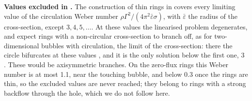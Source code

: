\documentclass[11pt]{article}
\begin{document}
\textbf{Values excluded in \cite{ms}.} The construction of thin rings in \cite{ms} covers every limiting value of the circulation Weber number \(\rho\Gamma^2/(4\pi^2\bar\varepsilon\sigma)\), with \(\bar\varepsilon\) the radius of the cross-section, except \(3, 4, 5, \dots\). At these values the linearised problem degenerates, and \cite{ms} expect rings with a non-circular cross-section to branch off, as for two-dimensional bubbles with circulation, the limit of the cross-section: there the circle bifurcates at these values \cite{wegmanncrowdy}, and it is the only solution below the first one, 3 \cite{niebel2d}. These would be axisymmetric branches. On the zero-flux rings this Weber number is at most 1.1, near the touching bubble, and below 0.3 once the rings are thin, so the excluded values are never reached; they belong to rings with a strong backflow through the hole, which we do not follow here.
\end{document}

